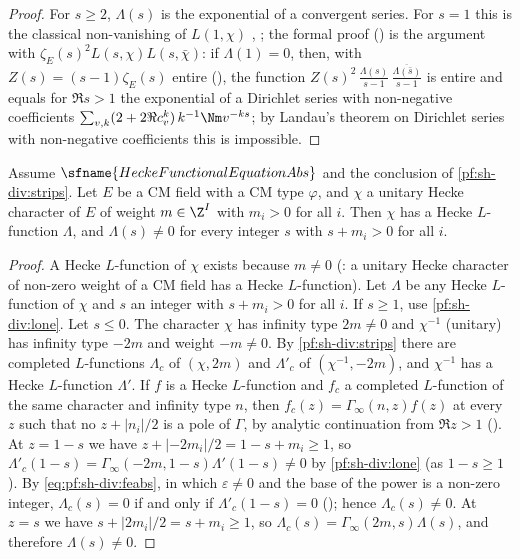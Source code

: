 \begin{proof}
For $s\ge2$, $\Lambda(s)$ is the exponential of a convergent series. For $s=1$ this is the classical non-vanishing of
$L(1,\chi)$ \cite{Hecke1920}, \cite[Ch.~VII]{Neukirch1999}; the formal proof
() is the argument with
$\zeta_E(s)^2L(s,\chi)L(s,\bar\chi)$: if $\Lambda(1)=0$, then, with $Z(s)=(s-1)\zeta_E(s)$ entire
(), the function
$Z(s)^2\,\frac{\Lambda(s)}{s-1}\,\frac{\overline{\Lambda(\bar s)}}{s-1}$ is entire and equals for $\Re s>1$ the exponential of a
Dirichlet series with non-negative coefficients $\sum_{v,k}(2+2\Re c_v^k)\,k^{-1}\Nm v^{-ks}$; by Landau's theorem on Dirichlet series
with non-negative coefficients this is impossible.
\end{proof}

\begin{lemma}\label{pf:sh-div:lnezeroint}
Assume $\sfname{HeckeFunctionalEquationAbs}$ and the conclusion of \cref{pf:sh-div:strips}. Let $E$ be a CM field with a CM type
$\varphi$, and $\chi$ a unitary Hecke character of $E$ of weight $m\in\Z^I$ with $m_i>0$ for all $i$. Then $\chi$ has a Hecke
$L$-function $\Lambda$, and $\Lambda(s)\ne0$ for every integer $s$ with $s+m_i>0$ for all $i$.
\end{lemma}

\begin{proof}
A Hecke $L$-function of $\chi$ exists because $m\ne0$
(: a unitary Hecke character of non-zero weight of a CM field has
a Hecke $L$-function). Let $\Lambda$ be any Hecke $L$-function of $\chi$ and $s$ an integer with $s+m_i>0$ for all $i$. If $s\ge1$, use
\cref{pf:sh-div:lone}. Let $s\le0$. The character $\chi$ has infinity type $2m\ne0$ and $\chi^{-1}$ (unitary) has infinity type
$-2m$ and weight $-m\ne0$. By \cref{pf:sh-div:strips} there are completed $L$-functions $\Lambda_c$ of $(\chi,2m)$ and $\Lambda'_c$ of
$(\chi^{-1},-2m)$, and $\chi^{-1}$ has a Hecke $L$-function $\Lambda'$. If $f$ is a Hecke $L$-function and $f_c$ a completed
$L$-function of the same character and infinity type $n$, then $f_c(z)=\Gamma_\infty(n,z)f(z)$ at every $z$ such that no
$z+|n_i|/2$ is a pole of $\Gamma$, by analytic continuation from $\Re z>1$
(). At $z=1-s$ we have $z+|{-2m_i}|/2=1-s+m_i\ge1$, so
$\Lambda'_c(1-s)=\Gamma_\infty(-2m,1-s)\Lambda'(1-s)\ne0$ by \cref{pf:sh-div:lone} (as $1-s\ge1$). By \eqref{eq:pf:sh-div:feabs}, in which
$\varepsilon\ne0$ and the base of the power is a non-zero integer, $\Lambda_c(s)=0$ if and only if $\Lambda'_c(1-s)=0$
(); hence $\Lambda_c(s)\ne0$. At $z=s$ we have $s+|2m_i|/2=s+m_i\ge1$, so
$\Lambda_c(s)=\Gamma_\infty(2m,s)\Lambda(s)$, and therefore $\Lambda(s)\ne0$.
\end{proof}


